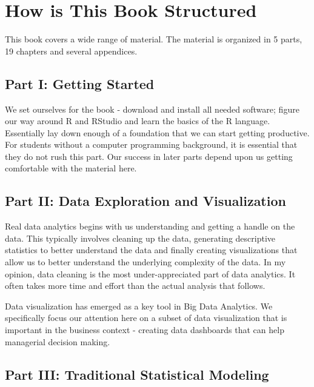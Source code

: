 \documentclass[]{krantz}
\theoremstyle{definition}
\theoremstyle{definition}
\theoremstyle{definition}
\theoremstyle{remark}
\begin{document}
\section*{How is This Book
Structured}\label{how-is-this-book-structured}


This book covers a wide range of material. The material is organized in
5 parts, 19 chapters and several appendices.

\subsection*{Part I: Getting Started}\label{part-i-getting-started}


We set ourselves for the book - download and install all needed
software; figure our way around R and RStudio and learn the basics of
the R language. Essentially lay down enough of a foundation that we can
start getting productive. For students without a computer programming
background, it is essential that they do not rush this part. Our success
in later parts depend upon us getting comfortable with the material
here.

\subsection*{Part II: Data Exploration and
Visualization}\label{part-ii-data-exploration-and-visualization}

Real data analytics begins with us understanding and getting a handle on
the data. This typically involves cleaning up the data, generating
descriptive statistics to better understand the data and finally
creating visualizations that allow us to better understand the
underlying complexity of the data. In my opinion, data cleaning is the
most under-appreciated part of data analytics. It often takes more time
and effort than the actual analysis that follows.

Data visualization has emerged as a key tool in Big Data Analytics. We
specifically focus our attention here on a subset of data visualization
that is important in the business context - creating data dashboards
that can help managerial decision making.

\subsection*{Part III: Traditional Statistical
Modeling}\label{part-iii-traditional-statistical-modeling}
\end{document}
